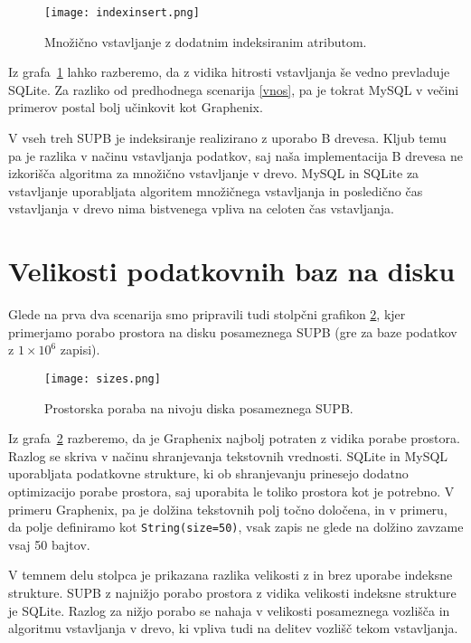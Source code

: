 \documentclass[a4paper,12pt,openright]{book}
\begin{document}
    \begin{figure}[H]
        \centerline{\texttt{[image: indexinsert.png]}}
        \caption{Množično vstavljanje z dodatnim indeksiranim atributom.}
        \label{index_vnos}
    \end{figure}

    \noindent
    Iz grafa~\ref{index_vnos} lahko razberemo, da z vidika hitrosti vstavljanja še vedno prevladuje SQLite. Za razliko od predhodnega scenarija \ref{vnos}, pa je tokrat MySQL v večini primerov postal bolj učinkovit kot Graphenix.

    V vseh treh SUPB je indeksiranje realizirano z uporabo B drevesa. Kljub temu pa je razlika v načinu vstavljanja podatkov, saj naša implementacija B drevesa ne izkorišča algoritma za množično vstavljanje v drevo. MySQL in SQLite za vstavljanje uporabljata algoritem množičnega vstavljanja in posledično čas vstavljanja v drevo nima bistvenega vpliva na celoten čas vstavljanja.
 
    \section{Velikosti podatkovnih baz na disku}
    \label{size_analysis}

    Glede na prva dva scenarija smo pripravili tudi stolpčni grafikon \ref{velikosti}, kjer primerjamo porabo prostora na disku posameznega SUPB (gre za baze podatkov z $1 \times 10^6$ zapisi). 
    
    \begin{figure}[H]
        \centerline{\texttt{[image: sizes.png]}}
        \caption{Prostorska poraba na nivoju diska posameznega SUPB.}
        \label{velikosti}
    \end{figure}

    \noindent
    Iz grafa~\ref{velikosti} razberemo, da je Graphenix najbolj potraten z vidika porabe prostora. Razlog se skriva v načinu shranjevanja tekstovnih vrednosti. SQLite in MySQL uporabljata podatkovne strukture, ki ob shranjevanju prinesejo dodatno optimizacijo porabe prostora, saj uporabita le toliko prostora kot je potrebno. V primeru Graphenix, pa je dolžina tekstovnih polj točno določena, in v primeru, da polje definiramo kot {\tt String(size=50)}, vsak zapis ne glede na dolžino zavzame vsaj 50 bajtov.

    V temnem delu stolpca je prikazana razlika velikosti z in brez uporabe indeksne strukture. SUPB z najnižjo porabo prostora z vidika velikosti indeksne strukture je SQLite. Razlog za nižjo porabo se nahaja v velikosti posameznega vozlišča in algoritmu vstavljanja v drevo, ki vpliva tudi na delitev vozlišč tekom vstavljanja.
\end{document}
